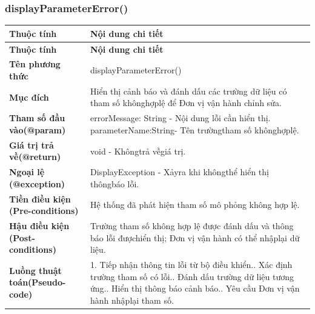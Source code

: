 \subsubsection{displayParameterError()}
\begin{longtable}{|L{0.24\textwidth}|L{0.70\textwidth}|}
\hline
\textbf{Thuộc tính} & \textbf{Nội dung chi tiết} \\
\hline
\endfirsthead
\hline
\textbf{Thuộc tính} & \textbf{Nội dung chi tiết} \\
\hline
\endhead
\textbf{Tên phương thức} & displayParameterError() \\
\hline
\textbf{Mục đích} & Hiển thị cảnh báo và đánh dấu các trường dữ liệu có tham số không\newline hợplệ để Đơn vị vận hành chỉnh sửa. \\
\hline
\textbf{Tham số đầu vào}\newline \textbf{(@param)} & errorMessage: String - Nội dung lỗi cần hiển thị. parameterName:\newline String- Tên trườngtham số khônghợplệ. \\
\hline
\textbf{Giá trị trả về(@return)} & void - Khôngtrả vềgiá trị. \\
\hline
\textbf{Ngoại lệ (@exception)} & DisplayException - Xảyra khi khôngthể hiển thị thôngbáo lỗi. \\
\hline
\textbf{Tiền điều kiện (Pre-}\newline \textbf{conditions)} & Hệ thống đã phát hiện tham số mô phỏng không hợp lệ. \\
\hline
\textbf{Hậu điều kiện (Post-}\newline \textbf{conditions)} & Trường tham số không hợp lệ được đánh dấu và thông báo lỗi được\newline hiển thị; Đơn vị vận hành có thể nhậplại dữ liệu. \\
\hline
\textbf{Luồng thuật toán}\newline \textbf{(Pseudo-code)} & 1. Tiếp nhận thông tin lỗi từ bộ điều khiển.. Xác định trường tham số có lỗi.. Đánh dấu trường dữ liệu tương ứng.. Hiển thị thông báo cảnh báo.. Yêu cầu Đơn vị vận hành nhậplại tham số. \\
\hline
\end{longtable}
\vspace{-0.5\baselineskip}
